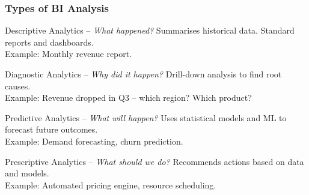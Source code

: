 \begin{frame}
  \frametitle{Types of BI Analysis}

  \begin{block}{Descriptive Analytics -- \textit{What happened?}}
    Summarises historical data. Standard reports and dashboards.\\
    Example: Monthly revenue report.
  \end{block}

  \begin{block}{Diagnostic Analytics -- \textit{Why did it happen?}}
    Drill-down analysis to find root causes.\\
    Example: Revenue dropped in Q3 -- which region? Which product?
  \end{block}

  \begin{block}{Predictive Analytics -- \textit{What will happen?}}
    Uses statistical models and ML to forecast future outcomes.\\
    Example: Demand forecasting, churn prediction.
  \end{block}

  \begin{block}{Prescriptive Analytics -- \textit{What should we do?}}
    Recommends actions based on data and models.\\
    Example: Automated pricing engine, resource scheduling.
  \end{block}

\end{frame}

